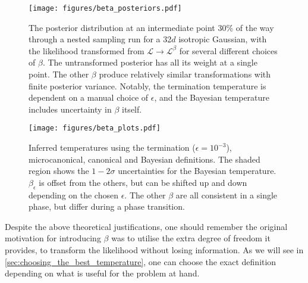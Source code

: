 \documentclass[usenatbib]{mnras}
\newcommand{\Like}{\mathcal{L}}
\begin{document}
\begin{figure*}
\begin{center}
    \texttt{[image: figures/beta\_posteriors.pdf]}
\end{center}
\caption{The posterior distribution at an intermediate point 30\% of the way through a nested sampling run for a 32$d$ isotropic Gaussian, with the likelihood transformed from  $\Like \to \Like^{\beta}$ for several different choices of $\beta$. The untransformed posterior has all its weight at a single point. The other $\beta$ produce relatively similar transformations with finite posterior variance. Notably, the termination temperature is dependent on a manual choice of $\epsilon$, and the Bayesian temperature includes uncertainty in $\beta$ itself.}
\label{fig:beta_posteriors}
\end{figure*}

\begin{figure}
\begin{center}
    \texttt{[image: figures/beta\_plots.pdf]}
\end{center}
\caption{Inferred temperatures using the termination ($\epsilon = 10^{-3}$), microcanonical, canonical and Bayesian definitions. The shaded region shows the $1-2\sigma$ uncertainties for the Bayesian temperature. $\beta_\epsilon$ is offset from the others, but can be shifted up and down depending on the chosen $\epsilon$. The other $\beta$ are all consistent in a single phase, but differ during a phase transition.}
\label{fig:beta_plots}
\end{figure}
Despite the above theoretical justifications, one should remember the original motivation for introducing $\beta$ was to utilise the extra degree of freedom it provides, to transform the likelihood without losing information. As we will see in \cref{sec:choosing_the_best_temperature}, one can choose the exact definition depending on what is useful for the problem at hand.
\end{document}
